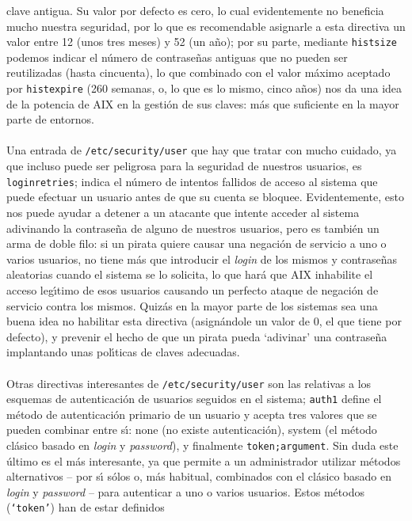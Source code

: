clave antigua. Su valor por defecto es cero, lo cual evidentemente no beneficia
mucho nuestra seguridad, por lo que es recomendable asignarle a esta directiva 
un valor entre 12 (unos tres meses) y 52 (un a\~no); por su parte, mediante 
{\tt histsize} podemos indicar el n\'umero de contrase\~nas antiguas que no 
pueden ser reutilizadas (hasta cincuenta), lo que combinado con el valor 
m\'aximo aceptado por {\tt histexpire} (260 semanas, o, lo que es lo mismo, 
cinco a\~nos) nos da una idea de la potencia de AIX en la gesti\'on de sus 
claves: m\'as que suficiente en la mayor parte de entornos.\\
\\Una entrada de {\tt /etc/security/user} que hay que tratar con mucho cuidado,
ya que incluso puede ser peligrosa para la seguridad de nuestros usuarios, es
{\tt loginretries}; indica el n\'umero de intentos fallidos de acceso al sistema
que puede efectuar un usuario antes de que su cuenta se bloquee. Evidentemente,
esto nos puede ayudar a detener a un atacante que intente acceder al sistema 
adivinando la contrase\~na de alguno de nuestros usuarios, pero es tambi\'en 
un arma de doble filo: si un pirata quiere causar una negaci\'on de servicio a
uno o varios usuarios, no tiene m\'as que introducir el {\it login} de los 
mismos y contrase\~nas aleatorias cuando el sistema se lo solicita, lo que 
har\'a que AIX inhabilite el acceso leg\'{\i}timo de esos usuarios causando un
perfecto ataque de negaci\'on de servicio contra los mismos. Quiz\'as en la
mayor parte de los sistemas sea una buena idea no habilitar esta directiva 
(asign\'andole un valor de 0, el que tiene por defecto), y prevenir el hecho de
que un pirata pueda `adivinar' una contrase\~na implantando unas pol\'{\i}ticas
de claves adecuadas.\\
\\Otras directivas interesantes de {\tt /etc/security/user} son las relativas a
los esquemas de autenticaci\'on de usuarios seguidos en el sistema; {\tt auth1}
define el m\'etodo de autenticaci\'on primario de un usuario y acepta tres 
valores que se pueden combinar entre s\'{\i}: {\sc none} (no existe 
autenticaci\'on), {\sc system} (el m\'etodo cl\'asico basado en {\it login} y 
{\it password}), y finalmente {\tt token;argument}. Sin duda este \'ultimo es
el m\'as interesante, ya que permite a un administrador utilizar m\'etodos 
alternativos -- por s\'{\i} s\'olos o, m\'as habitual, combinados con el 
cl\'asico basado en {\it login} y {\it password} -- para autenticar a uno o
varios usuarios. Estos m\'etodos ({\tt `token'}) han de estar definidos 
